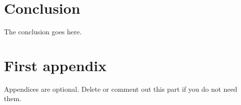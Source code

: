 \documentclass[journal]{IEEEtran}
\begin{document}
\section{Conclusion}
The conclusion goes here.






\appendices
\section{First appendix}
Appendices are optional. Delete or comment out this part if you do not need them.

\end{document}
